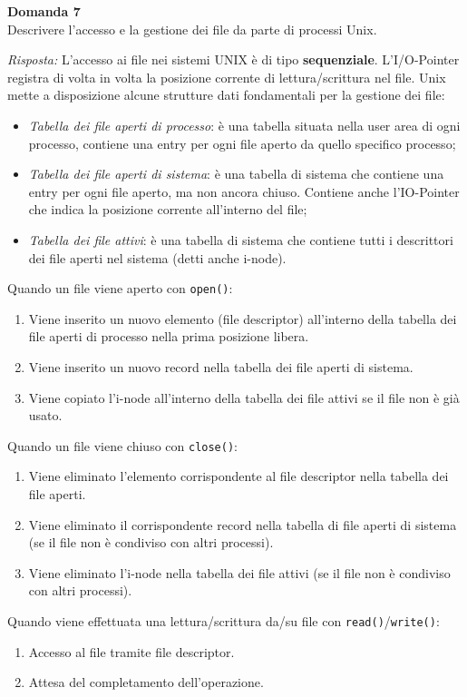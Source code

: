 \documentclass{article}
\newenvironment{problem}[2][Domanda]
    { \begin{mdframed}[backgroundcolor=gray!20] \textbf{#1 #2} \\}
    {  \end{mdframed}}
\newenvironment{solution}
    {\textit{Risposta:}}
    {}
\begin{document}
\begin{problem}{7}
Descrivere l'accesso e la gestione dei file da parte di processi Unix.
\end{problem}
\begin{solution}
L’accesso ai file nei sistemi UNIX è di tipo \textbf{sequenziale}.
L'I/O-Pointer registra di volta in volta la posizione corrente di lettura/scrittura nel file.
\newline
\newline
Unix mette a disposizione alcune strutture dati fondamentali per la gestione dei file:
\begin{itemize}
    \item \emph{Tabella dei file aperti di processo}: è una tabella situata nella user area di ogni processo, contiene una entry per ogni file aperto da quello specifico processo;
    \item \emph{Tabella dei file aperti di sistema}: è una tabella di sistema che contiene una entry per ogni file aperto, ma non ancora chiuso. Contiene anche l’IO-Pointer che indica la posizione corrente all’interno del file;
    \item \emph{Tabella dei file attivi}: è una tabella di sistema che contiene tutti i descrittori dei file aperti nel sistema (detti anche i-node).
\end{itemize}
Quando un file viene aperto con \texttt{open()}:
\begin{enumerate}
    \item Viene inserito un nuovo elemento (file descriptor) all’interno della tabella dei file aperti di  processo nella prima posizione libera.
    \item Viene inserito un nuovo record nella tabella dei file aperti di sistema.
    \item Viene copiato l’i-node all’interno della tabella dei file attivi se il file non è già usato.
\end{enumerate}
Quando un file viene chiuso con \texttt{close()}:
\begin{enumerate}
    \item Viene eliminato l’elemento corrispondente al file descriptor nella tabella dei file aperti.
    \item Viene eliminato il corrispondente record nella tabella di file aperti di sistema (se il file non è condiviso con altri processi).
    \item Viene eliminato l’i-node nella tabella dei file attivi (se il file non è condiviso con altri processi).
\end{enumerate}
Quando viene effettuata una lettura/scrittura da/su file con \texttt{read()}/\texttt{write()}:
\begin{enumerate}
    \item Accesso al file tramite file descriptor.
    \item Attesa del completamento dell’operazione.
\end{enumerate}
\end{solution}
\end{document}
